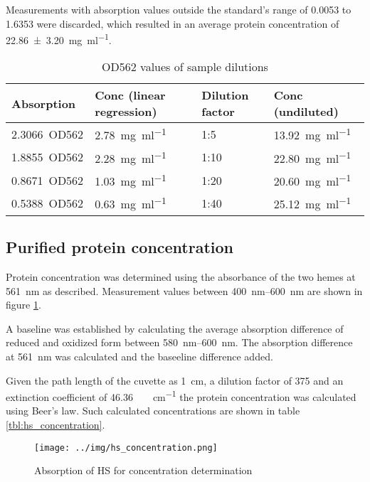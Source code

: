 Measurements with absorption values outside the standard's range of 0.0053 to
1.6353 were discarded, which resulted in an average protein concentration of
\SI{22.86 \pm 3.20}{\mg\per\ml}.

\begin{table}
	\centering
	\begin{tabu}{llll}
		\toprule
		Absorption & Conc (linear regression) & Dilution factor & Conc (undiluted) \\
		\midrule
		\SI{2.3066}{OD562} & \SI{2.78}{\mg\per\ml} & 1:5  & \SI{13.92}{\mg\per\ml} \\
		\SI{1.8855}{OD562} & \SI{2.28}{\mg\per\ml} & 1:10 & \SI{22.80}{\mg\per\ml} \\
		\SI{0.8671}{OD562} & \SI{1.03}{\mg\per\ml} & 1:20 & \SI{20.60}{\mg\per\ml} \\
		\SI{0.5388}{OD562} & \SI{0.63}{\mg\per\ml} & 1:40 & \SI{25.12}{\mg\per\ml} \\
		\bottomrule
	\end{tabu}
	\caption{OD562 values of sample dilutions}
	\label{tbl:bca_absorption_sample}
\end{table}

\subsection{Purified protein concentration}

Protein concentration was determined using the absorbance of the two hemes at
\SI{561}{\nm} as described. Measurement values between \SIrange{400}{600}{\nm}
are shown in figure \ref{fig:hs_concentration}.

A baseline was established by calculating the average absorption difference of
reduced and oxidized form between \SIrange{580}{600}{\nm}. The absorption
difference at \SI{561}{\nm} was calculated and the baseeline difference added.

Given the path length of the cuvette as \SI{1}{\cm}, a dilution factor of 375
and an extinction coefficient of \SI{46.36}{\per\milli\Molar\per\cm} the
protein concentration was calculated using Beer's law. Such calculated
concentrations are shown in table \ref{tbl:hs_concentration}.

\begin{figure}
	\centering
	\texttt{[image: ../img/hs\_concentration.png]}
	\caption{Absorption of HS for concentration determination}
	\label{fig:hs_concentration}
\end{figure}

